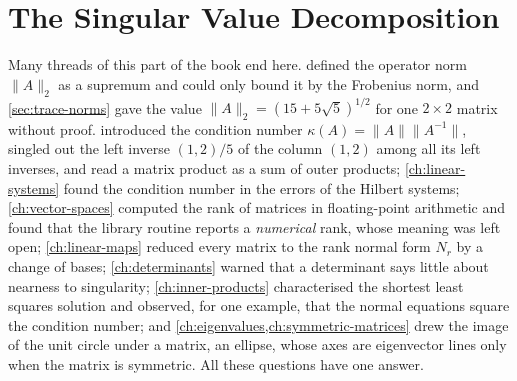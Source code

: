 \chapter{The Singular Value Decomposition}
\label{ch:svd}


Many threads of this part of the book end here.  defined the operator norm $\|A\|_2$ as a supremum and could only bound it by the Frobenius norm, and \cref{sec:trace-norms} gave the value $\|A\|_2=(15+5\sqrt5)^{1/2}$ for one $2\times2$ matrix without proof.  introduced the condition number $\kappa(A)=\|A\|\|A^{-1}\|$, singled out the left inverse $(1,2)/5$ of the column $(1,2)$ among all its left inverses, and read a matrix product as a sum of outer products; \cref{ch:linear-systems} found the condition number in the errors of the Hilbert systems; \cref{ch:vector-spaces} computed the rank of matrices in floating-point arithmetic and found that the library routine reports a \emph{numerical} rank, whose meaning was left open; \cref{ch:linear-maps} reduced every matrix to the rank normal form $N_r$ by a change of bases; \cref{ch:determinants} warned that a determinant says little about nearness to singularity; \cref{ch:inner-products} characterised the shortest least squares solution and observed, for one example, that the normal equations square the condition number; and \cref{ch:eigenvalues,ch:symmetric-matrices} drew the image of the unit circle under a matrix, an ellipse, whose axes are eigenvector lines only when the matrix is symmetric. All these questions have one answer.

